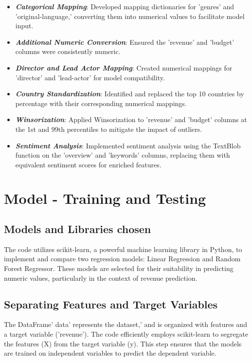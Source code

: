 \documentclass[conference]{IEEEtran}
\begin{document}
\begin{itemize}
    \item \textbf{\textit{Categorical Mapping}}: Developed mapping dictionaries for 'genres' and 'original-language,' converting them into numerical values to facilitate model input.
    \item \textbf{\textit{Additional Numeric Conversion}}: Ensured the 'revenue' and 'budget' columns were consistently numeric.
    \item \textbf{\textit{Director and Lead Actor Mapping}}: Created numerical mappings for 'director' and 'lead-actor' for model compatibility.
    \item \textbf{\textit{Country Standardization}}: Identified and replaced the top 10 countries by percentage with their corresponding numerical mappings.
    \item \textbf{\textit{Winsorization}}: Applied Winsorization to 'revenue' and 'budget' columns at the 1st and 99th percentiles to mitigate the impact of outliers.
    \item \textbf{\textit{Sentiment Analysis}}: Implemented sentiment analysis using the TextBlob function on the 'overview' and 'keywords' columns, replacing them with equivalent sentiment scores for enriched features.
\end{itemize}

\section{Model - Training and Testing}

\subsection{Models and Libraries chosen}
The code utilizes scikit-learn, a powerful machine learning library in Python, to implement and compare two regression models: Linear Regression and Random Forest Regressor. These models are selected for their suitability in predicting numeric values, particularly in the context of revenue prediction.

\subsection{Separating Features and Target Variables}
The DataFrame' data' represents the dataset,' and is organized with features and a target variable ('revenue'). The code efficiently employs scikit-learn to segregate the features (X) from the target variable (y). This step ensures that the models are trained on independent variables to predict the dependent variable.
\end{document}
